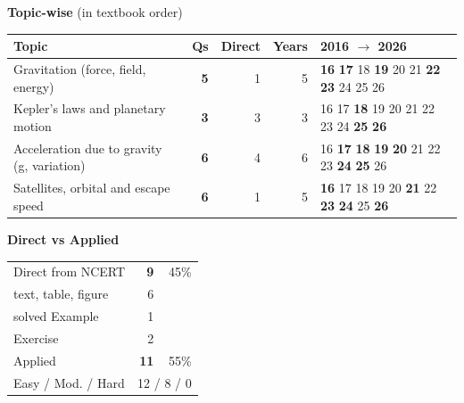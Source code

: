 {\small\textbf{\color{crimson}Topic-wise} (in textbook order)\par\smallskip
\begin{tabularx}{\linewidth}{@{}>{\raggedright\arraybackslash}Xrrrl@{}}\toprule
Topic & Qs & Direct & Years & 2016 $\rightarrow$ 2026\\\midrule
Gravitation (force, field, energy) & \textbf{5} & 1 & 5 & {\scriptsize \textbf{16} \textbf{17} {\color{gray!45}18} \textbf{19} {\color{gray!45}20} {\color{gray!45}21} \textbf{22} \textbf{23} {\color{gray!45}24} {\color{gray!45}25} {\color{gray!45}26}}\\
Kepler's laws and planetary motion & \textbf{3} & 3 & 3 & {\scriptsize {\color{gray!45}16} {\color{gray!45}17} \textbf{18} {\color{gray!45}19} {\color{gray!45}20} {\color{gray!45}21} {\color{gray!45}22} {\color{gray!45}23} {\color{gray!45}24} \textbf{25} \textbf{26}}\\
Acceleration due to gravity (g, variation) & \textbf{6} & 4 & 6 & {\scriptsize {\color{gray!45}16} \textbf{17} \textbf{18} \textbf{19} \textbf{20} {\color{gray!45}21} {\color{gray!45}22} {\color{gray!45}23} \textbf{24} \textbf{25} {\color{gray!45}26}}\\
Satellites, orbital and escape speed & \textbf{6} & 1 & 5 & {\scriptsize \textbf{16} {\color{gray!45}17} {\color{gray!45}18} {\color{gray!45}19} {\color{gray!45}20} \textbf{21} {\color{gray!45}22} \textbf{23} \textbf{24} {\color{gray!45}25} \textbf{26}}\\
\bottomrule\end{tabularx}}\par\medskip
\begin{minipage}[t]{0.34\linewidth}{\small\textbf{\color{crimson}Direct vs Applied}\par\smallskip
\begin{tabular}{@{}lrr@{}}\toprule
Direct from NCERT & \textbf{9} & 45\%\\
\quad text, table, figure & 6 &\\
\quad solved Example & 1 &\\
\quad Exercise & 2 &\\
Applied & \textbf{11} & 55\%\\\midrule
Easy / Mod. / Hard & \multicolumn{2}{r}{12 / 8 / 0}\\\bottomrule
\end{tabular}}\end{minipage}\hfill

